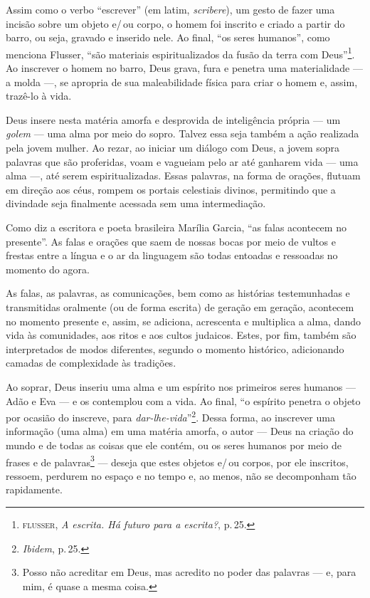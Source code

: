 Assim como o verbo ``escrever'' (em latim, \emph{scribere}), um gesto de
fazer uma incisão sobre um objeto e/\,ou corpo, o homem foi inscrito e
criado a partir do barro, ou seja, gravado e inserido nele. Ao final,
``os seres humanos'', como menciona Flusser, ``são
materiais espiritualizados da fusão da terra com Deus''\footnote{\textsc{flusser},
  \emph{A escrita. Há futuro para a escrita?}, p.\,25.}. Ao inscrever o
homem no barro, Deus grava, fura e penetra uma materialidade --- a molda
---, se apropria de sua maleabilidade física para criar o homem e,
assim, trazê-lo à vida.

Deus insere nesta matéria amorfa e desprovida de inteligência própria
--- um \emph{golem} --- uma alma por meio do sopro. Talvez essa seja
também a ação realizada pela jovem mulher. Ao rezar, ao iniciar um
diálogo com Deus, a jovem sopra palavras que são proferidas, voam e
vagueiam pelo ar até ganharem vida --- uma alma ---, até serem
espiritualizadas. Essas palavras, na forma de orações, flutuam em
direção aos céus, rompem os portais celestiais divinos, permitindo que a
divindade seja finalmente acessada sem uma intermediação.

Como diz a escritora e poeta brasileira Marília Garcia, ``as falas
acontecem no presente''. As falas e orações que saem de nossas bocas
por meio de vultos e frestas entre a língua e o ar da linguagem são
todas entoadas e ressoadas no momento do agora.

As falas, as palavras, as comunicações, bem como as histórias
testemunhadas e transmitidas oralmente (ou de forma escrita) de geração
em geração, acontecem no momento presente e, assim, se adiciona,
acrescenta e multiplica a alma, dando vida às comunidades, aos ritos e
aos cultos judaicos. Estes, por fim, também são interpretados de modos
diferentes, segundo o momento histórico, adicionando camadas de
complexidade às tradições.

Ao soprar, Deus inseriu uma alma e um espírito nos primeiros seres
humanos --- Adão e Eva --- e os contemplou com a vida. Ao final,
``o espírito penetra o objeto por ocasião do inscreve, para \emph{dar-lhe-vida}''\footnote{\emph{Ibidem}, p.\,25.}. Dessa forma, ao inscrever
uma informação (uma alma) em uma matéria amorfa, o autor --- Deus na
criação do mundo e de todas as coisas que ele contém, ou os seres
humanos por meio de frases e de palavras\footnote{Posso não acreditar em
  Deus, mas acredito no poder das palavras --- e, para mim, é quase a
  mesma coisa.} --- deseja que estes objetos e/\,ou corpos, por ele
inscritos, ressoem, perdurem no espaço e no tempo e, ao menos, não se
decomponham tão rapidamente.

